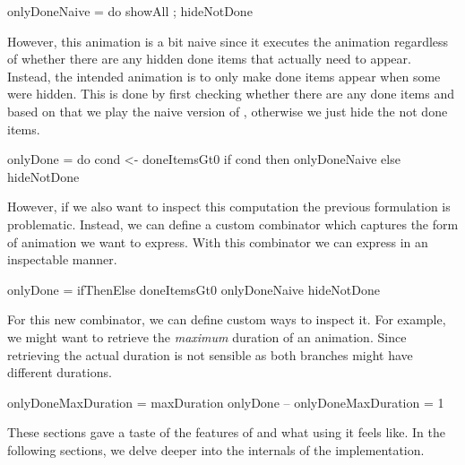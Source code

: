 \begin{spec}
onlyDoneNaive = do showAll ; hideNotDone
\end{spec}

However, this animation is a bit naive since it executes the  animation regardless of whether there are any hidden done items that actually need to appear. Instead, the intended animation is to only make done items appear when some were hidden. This is done by first checking whether there are any done items and based on that we play the naive version of , otherwise we just hide the not done items.

\begin{spec}
onlyDone = do
  cond <- doneItemsGt0
  if cond then onlyDoneNaive else hideNotDone
\end{spec}

However, if we also want to inspect this computation the previous formulation is problematic. Instead, we can define a custom combinator  which captures the form of animation we want to express. With this combinator we can express  in an inspectable manner.

\begin{spec}
onlyDone = ifThenElse doneItemsGt0
  onlyDoneNaive
  hideNotDone
\end{spec}

For this new combinator, we can define custom ways to inspect it. For example, we might want to retrieve the \emph{maximum} duration of an animation. Since retrieving the actual duration is not sensible as both branches might have different durations.

\begin{spec}
onlyDoneMaxDuration = maxDuration onlyDone
-- onlyDoneMaxDuration = 1
\end{spec}

These sections gave a taste of the features of \dsl{} and what using it feels like. In the following sections, we delve deeper into the internals of the implementation.
